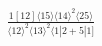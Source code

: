 \documentclass[varwidth, border=5pt]{standalone}
\begin{document}
\begin{my}
$\begin{gathered}
\scriptscriptstyle\frac{1[12]⟨15⟩⟨14⟩^2⟨25⟩}{⟨12⟩^2⟨13⟩^2⟨1|2+5|1]}
\end{gathered}$
\end{my}
\end{document}
